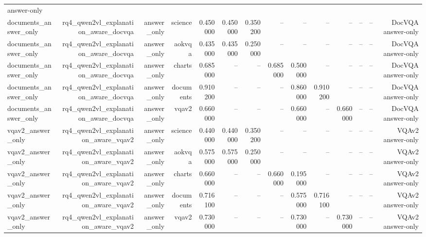\begin{table}
\begin{tabular}{lrrrrrrrrrrrrr}
answer-only \\
documents_answer_only & rq4_qwen2vl_explanation_aware_docvqa & answer_only & science & 0.450000 & 0.450000 & 0.350200 & -- & -- & -- & -- & -- & -- & DocVQA
answer-only \\
documents_answer_only & rq4_qwen2vl_explanation_aware_docvqa & answer_only & aokvqa & 0.435000 & 0.435000 & 0.250000 & -- & -- & -- & -- & -- & -- & DocVQA
answer-only \\
documents_answer_only & rq4_qwen2vl_explanation_aware_docvqa & answer_only & charts & 0.685000 & -- & -- & 0.685000 & 0.500000 & -- & -- & -- & -- & DocVQA
answer-only \\
documents_answer_only & rq4_qwen2vl_explanation_aware_docvqa & answer_only & documents & 0.910200 & -- & -- & -- & 0.860000 & 0.910200 & -- & -- & -- & DocVQA
answer-only \\
documents_answer_only & rq4_qwen2vl_explanation_aware_docvqa & answer_only & vqav2 & 0.660000 & -- & -- & -- & 0.660000 & -- & 0.660000 & -- & -- & DocVQA
answer-only \\
vqav2_answer_only & rq4_qwen2vl_explanation_aware_vqav2 & answer_only & science & 0.440000 & 0.440000 & 0.350200 & -- & -- & -- & -- & -- & -- & VQAv2
answer-only \\
vqav2_answer_only & rq4_qwen2vl_explanation_aware_vqav2 & answer_only & aokvqa & 0.575000 & 0.575000 & 0.250000 & -- & -- & -- & -- & -- & -- & VQAv2
answer-only \\
vqav2_answer_only & rq4_qwen2vl_explanation_aware_vqav2 & answer_only & charts & 0.660000 & -- & -- & 0.660000 & 0.195000 & -- & -- & -- & -- & VQAv2
answer-only \\
vqav2_answer_only & rq4_qwen2vl_explanation_aware_vqav2 & answer_only & documents & 0.716100 & -- & -- & -- & 0.575000 & 0.716100 & -- & -- & -- & VQAv2
answer-only \\
vqav2_answer_only & rq4_qwen2vl_explanation_aware_vqav2 & answer_only & vqav2 & 0.730000 & -- & -- & -- & 0.730000 & -- & 0.730000 & -- & -- & VQAv2
answer-only \\
\bottomrule
\end{tabular}
\end{table}
